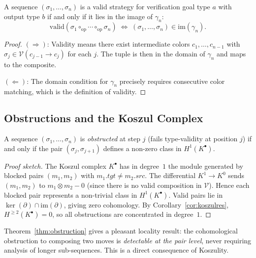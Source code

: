 \documentclass[11pt]{article}
\newcommand{\Vop}{\mathcal{V}}           %
\newcommand{\Kcom}{K^{\bullet}}          %
\newcommand{\opcomp}{\circ_{\mathrm{op}}}%
\newcommand{\strat}{\sigma}              %
\newcommand{\validseq}[1]{\mathrm{valid}(#1)}  %
\newcommand{\im}{\mathrm{im}}            %
\begin{document}
\begin{theorem}\label{thm:image}
A sequence $(\strat_1,\ldots,\strat_n)$ is a valid strategy for
verification goal type $a$ with output type $b$ if and only if it lies
in the image of $\gamma_n$:
\[
  \validseq{\strat_1 \opcomp \cdots \opcomp \strat_n}
  \;\iff\;
  (\strat_1,\ldots,\strat_n) \in \im(\gamma_n).
\]
\end{theorem}

\begin{proof}
$(\Rightarrow)$: Validity means there exist intermediate colors
$c_1,\ldots,c_{n-1}$ with $\strat_j \in \Vop(c_{j-1} \to c_j)$ for
each $j$.  The tuple is then in the domain of $\gamma_n$ and maps to
the composite.

$(\Leftarrow)$: The domain condition for $\gamma_n$ precisely requires
consecutive color matching, which is the definition of validity.
\end{proof}

\subsection{Obstructions and the Koszul Complex}

\begin{theorem}\label{thm:obstruction}
A sequence $(\strat_1,\ldots,\strat_n)$ is \emph{obstructed} at step
$j$ (fails type-validity at position $j$) if and only if the pair
$(\strat_j, \strat_{j+1})$ defines a non-zero class in $H^1(\Kcom)$.
\end{theorem}

\begin{proof}[Proof sketch]
The Koszul complex $\Kcom$ has in degree~$1$ the module generated by
blocked pairs $(m_1, m_2)$ with
$m_1.\mathit{tgt} \neq m_2.\mathit{src}$.
The differential
$K^1 \to K^0$ sends $(m_1, m_2)$ to
$m_1 \otimes m_2 - 0$ (since there is no valid composition in $\Vop$).
Hence each blocked pair represents a non-trivial class in $H^1(\Kcom)$.
Valid pairs lie in $\ker(\partial) \cap \im(\partial)$, giving zero
cohomology.
By Corollary~\ref{cor:koszulres}, $H^{\ge 2}(\Kcom) = 0$, so all
obstructions are concentrated in degree~$1$.
\end{proof}

\begin{remark}
Theorem~\ref{thm:obstruction} gives a pleasant locality result: the
cohomological obstruction to composing two moves is \emph{detectable
at the pair level}, never requiring analysis of longer sub-sequences.
This is a direct consequence of Koszulity.
\end{remark}
\end{document}
